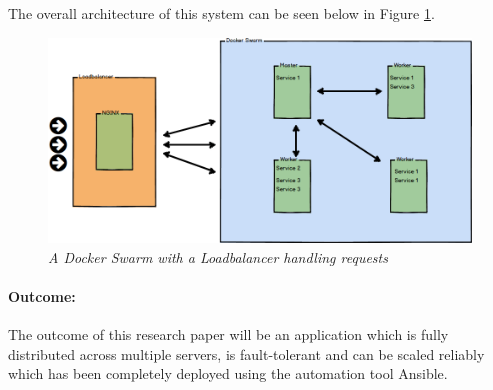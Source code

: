 \documentclass{article}
\begin{document}
The overall architecture of this system can be seen below in Figure \ref{fig:swarm}.

\begin{figure}[!hb]
\centering
\includegraphics*[width=\textwidth]{swarm}
\caption{\em A Docker Swarm with a Loadbalancer handling requests}
\label{fig:swarm}
\end{figure}

\paragraph{Outcome:}
\label{par:Outcome}
The outcome of this research paper will be an application which is fully distributed across multiple servers, is fault-tolerant and can be scaled reliably which has been completely deployed using the automation tool Ansible.
\end{document}
